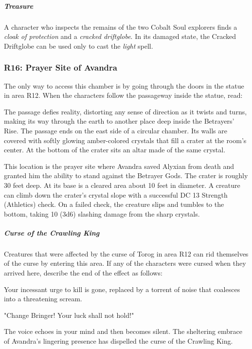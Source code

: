 \documentclass[10pt,a4paper,twoside,bg=print,twocolumn,openany,nodeprecatedcode]{dndbook}
\begin{document}
\subparagraph{Treasure}
A character who inspects the remains of the two Cobalt Soul explorers finds a \textit{cloak of protection} and a \textit{cracked driftglobe}. In its damaged state, the Cracked Driftglobe can be used only to cast the \textit{light} spell.

\subsubsection{R16: Prayer Site of Avandra}
The only way to access this chamber is by going through the doors in the statue in area R12. When the characters follow the passageway inside the statue, read:

\begin{DndReadAloud}{}
The passage defies reality, distorting any sense of direction as it twists and turns, making its way through the earth to another place deep inside the Betrayers' Rise. The passage ends on the east side of a circular chamber. Its walls are covered with softly glowing amber-colored crystals that fill a crater at the room's center. At the bottom of the crater sits an altar made of the same crystal.

\end{DndReadAloud}

This location is the prayer site where Avandra saved Alyxian from death and granted him the ability to stand against the Betrayer Gods. The crater is roughly 30 feet deep. At its base is a cleared area about 10 feet in diameter. A creature can climb down the crater's crystal slope with a successful DC 13 Strength (Athletics) check. On a failed check, the creature slips and tumbles to the bottom, taking 10 (3d6) slashing damage from the sharp crystals.

\subparagraph{Curse of the Crawling King}
Creatures that were affected by the curse of Torog in area R12 can rid themselves of the curse by entering this area. If any of the characters were cursed when they arrived here, describe the end of the effect as follows:

\begin{DndReadAloud}{}
Your incessant urge to kill is gone, replaced by a torrent of noise that coalesces into a threatening scream.

"Change Bringer! Your luck shall not hold!"

The voice echoes in your mind and then becomes silent. The sheltering embrace of Avandra's lingering presence has dispelled the curse of the Crawling King.

\end{DndReadAloud}
\end{document}
